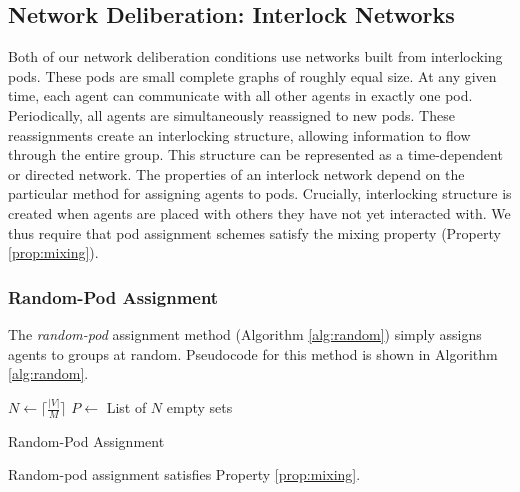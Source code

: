 \subsection{Network Deliberation: Interlock Networks}
Both of our network deliberation conditions use networks built from interlocking pods.
These pods are small complete graphs of roughly equal size.
At any given time, each agent can communicate with all other agents in exactly one pod.
Periodically, all agents are simultaneously reassigned to new pods.
These reassignments create an interlocking structure, allowing information to flow through the entire group.
This structure can be represented as a time-dependent or directed network.
The properties of an interlock network depend on the particular method for assigning agents to pods.
Crucially, interlocking structure is created when agents are placed with others they have not yet interacted with.
We thus require that pod assignment schemes satisfy the mixing property (Property \ref{prop:mixing}).

\subsubsection{Random-Pod Assignment}
The {\em random-pod} assignment method (Algorithm \ref{alg:random}) simply assigns agents to groups at random. Pseudocode for this method is shown in Algorithm \ref{alg:random}.

\begin{algorithm}
\SetAlgoLined
\DontPrintSemicolon
{}
    $N \longleftarrow \lceil \frac{|V|}{M} \rceil$ \;
    $P \longleftarrow$ List of $N$ empty sets \;
\caption{Random-Pod Assignment}
\label{alg:random}
\end{algorithm}

\begin{claim}
Random-pod assignment satisfies Property \ref{prop:mixing}.
\end{claim}

